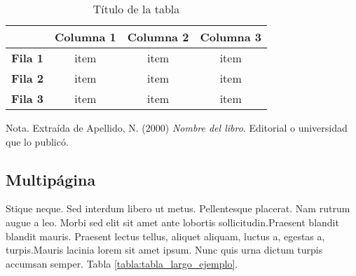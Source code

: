 \begin{table}[H]
    \caption{Título de la tabla}
    \label{tabla:ejemplo}
    \begin{center}
        \begin{tabular}{c|c|c|c|}
            \cline{2-4}
            & \textbf{Columna 1} & \textbf{Columna 2} & \textbf{Columna 3} \\ \hline
            \multicolumn{1}{|c|}{\textbf{Fila 1}} & item               & item               & item               \\ \hline
            \multicolumn{1}{|c|}{\textbf{Fila 2}} & item               & item               & item               \\ \hline
            \multicolumn{1}{|c|}{\textbf{Fila 3}} & item               & item               & item               \\ \hline
        \end{tabular}
    \end{center}
    Nota. Extraída de Apellido, N. (2000) \textit{Nombre del libro}.
    Editorial o universidad que lo publicó.
\end{table}

\subsection{Multipágina}
Stique neque. Sed interdum libero ut metus.
Pellentesque placerat. Nam rutrum augue a leo. Morbi sed 
elit sit amet ante lobortis sollicitudin.Praesent blandit 
blandit mauris. Praesent lectus tellus, aliquet aliquam,
luctus a, egestas a, turpis.Mauris lacinia lorem sit amet
ipsum. Nunc quis urna dictum turpis accumsan semper. Tabla
\ref{tabla:tabla_largo_ejemplo}.\\

